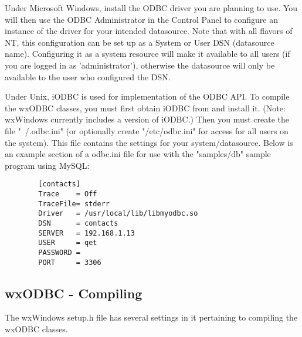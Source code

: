 Under Microsoft Windows, install the ODBC driver you are planning to use. You 
will then use the ODBC Administrator in the Control Panel to configure an 
instance of the driver for your intended datasource. Note that with all 
flavors of NT, this configuration can be set up as a System or User DSN 
(datasource name). Configuring it as a system resource will make it 
available to all users (if you are logged in as 'administrator'), otherwise 
the datasource will only be available to the user who configured the DSN.

Under Unix, iODBC is used for implementation of the ODBC API. To compile the 
wxODBC classes, you must first obtain iODBC from  and install it. 
(Note: wxWindows currently includes a version of iODBC.) Then you must create the file "~/.odbc.ini" (or optionally create 
"/etc/odbc.ini" for access for all users on the system). This file contains 
the settings for your system/datasource. Below is an example section of a 
odbc.ini file for use with the "samples/db" sample program using MySQL:

\begin{verbatim}
        [contacts]
        Trace    = Off
        TraceFile= stderr
        Driver   = /usr/local/lib/libmyodbc.so
        DSN      = contacts
        SERVER   = 192.168.1.13
        USER     = qet
        PASSWORD = 
        PORT     = 3306
\end{verbatim}

\subsection{wxODBC - Compiling}\label{wxodbccompiling}

The wxWindows setup.h file has several settings in it pertaining to compiling 
the wxODBC classes.

